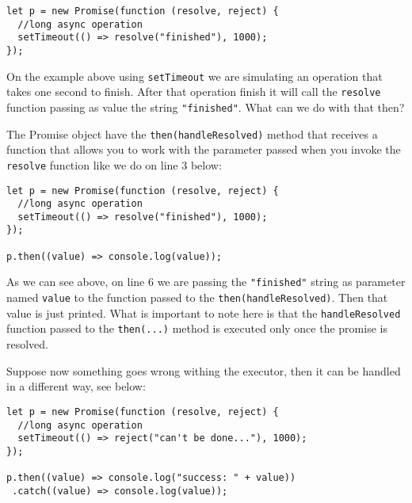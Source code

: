 \documentclass[a4paper, oneside, titlepage, 12pt]{book}
\begin{document}
\begin{verbatim}
let p = new Promise(function (resolve, reject) {
  //long async operation
  setTimeout(() => resolve("finished"), 1000);
});
\end{verbatim}

On the example above using \texttt{setTimeout} we are simulating an operation that takes one second to finish. After that operation finish it will call the \texttt{resolve} function passing as value the string \texttt{"finished"}. What can we do with that then?
\newline

The Promise object have the \texttt{then(handleResolved)} method that receives a function that allows you to work with the parameter passed when you invoke the \texttt{resolve} function like we do on line 3 below:   

\begin{verbatim}
let p = new Promise(function (resolve, reject) {
  //long async operation
  setTimeout(() => resolve("finished"), 1000);
});

p.then((value) => console.log(value));
\end{verbatim}

As we can see above, on line 6 we are passing the \texttt{"finished"} string as parameter named \texttt{value} to the function passed to the \texttt{then(handleResolved)}. Then that value is just printed. What is important to note here is that the \texttt{handleResolved} function passed to the \texttt{then(...)} method is executed only once the promise is resolved.
\newline

Suppose now something goes wrong withing the executor, then it can be handled in a different way, see below:

\begin{verbatim}
let p = new Promise(function (resolve, reject) {
  //long async operation
  setTimeout(() => reject("can't be done..."), 1000);
});

p.then((value) => console.log("success: " + value))
 .catch((value) => console.log(value));
\end{verbatim}
\end{document}
